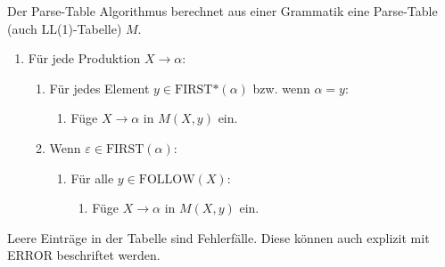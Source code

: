 \begin{algo}
Der Parse-Table Algorithmus berechnet aus einer Grammatik eine Parse-Table (auch LL(1)-Tabelle) $M$.
\begin{enumerate}
\item Für jede Produktion $X \to \alpha$:
\begin{enumerate}
\item Für jedes Element $y \in \text{FIRST*}(\alpha)$ bzw. wenn $\alpha = y$:
\begin{enumerate}
\item Füge $X \to \alpha$ in $M(X,y)$ ein.
\end{enumerate}
\item Wenn $\varepsilon \in \text{FIRST}(\alpha)$:
\begin{enumerate}
\item Für alle $y \in \text{FOLLOW}(X)$:
\begin{enumerate}
\item Füge $X \to \alpha$ in $M(X,y)$ ein.
\end{enumerate}
\end{enumerate}
\end{enumerate}
\end{enumerate}
Leere Einträge in der Tabelle sind Fehlerfälle. Diese können auch explizit mit ERROR beschriftet werden.
\end{algo}

